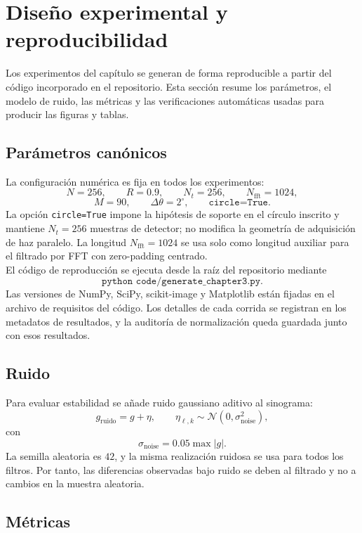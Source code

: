 \section{Diseño experimental y reproducibilidad}

Los experimentos del capítulo se generan de forma reproducible a partir del código incorporado en el repositorio. Esta sección resume los parámetros, el modelo de ruido, las métricas y las verificaciones automáticas usadas para producir las figuras y tablas.

\subsection*{Parámetros canónicos}

La configuración numérica es fija en todos los experimentos:
\[
N=256,
\qquad
R=0.9,
\qquad
N_t=256,
\qquad
N_{\mathrm{fft}}=1024,
\]
\[
M=90,
\qquad
\Delta\theta=2^\circ,
\qquad
\texttt{circle=True}.
\]
La opción \texttt{circle=True} impone la hipótesis de soporte en el círculo inscrito y mantiene $N_t=256$ muestras de detector; no modifica la geometría de adquisición de haz paralelo. La longitud $N_{\mathrm{fft}}=1024$ se usa solo como longitud auxiliar para el filtrado por FFT con zero-padding centrado.\\

El código de reproducción se ejecuta desde la raíz del repositorio mediante
\[
\texttt{python code/generate\_chapter3.py}.
\]
Las versiones de NumPy, SciPy, scikit-image y Matplotlib están fijadas en el archivo de requisitos del código. Los detalles de cada corrida se registran en los metadatos de resultados, y la auditoría de normalización queda guardada junto con esos resultados.

\subsection*{Ruido}

Para evaluar estabilidad se añade ruido gaussiano aditivo al sinograma:
\[
g_{\mathrm{ruido}}=g+\eta,
\qquad
\eta_{\ell,k}\sim\mathcal N(0,\sigma_{\mathrm{noise}}^2),
\]
con
\[
\sigma_{\mathrm{noise}}=0.05\max |g|.
\]
La semilla aleatoria es $42$, y la misma realización ruidosa se usa para todos los filtros. Por tanto, las diferencias observadas bajo ruido se deben al filtrado y no a cambios en la muestra aleatoria.

\subsection*{Métricas}

